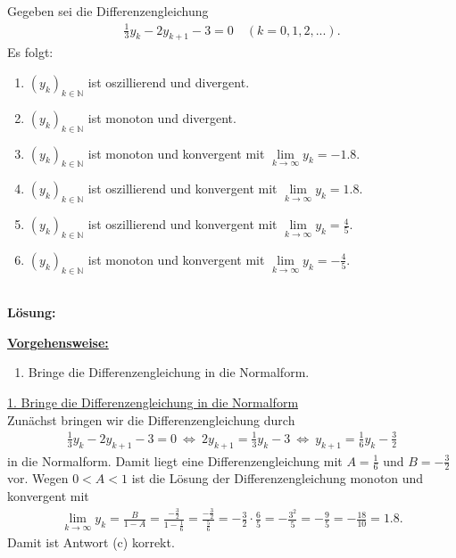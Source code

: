 \subsection*{}
Gegeben sei die Differenzengleichung
\begin{align*}
	\frac{1}{3} y_k
	-
	2 y_{k+1}
	-3
	=0
	\quad (k = 0,1,2,...).
\end{align*}
Es folgt:
\renewcommand{\labelenumi}{(\alph{enumi})}
\begin{enumerate}
	\item
	$ (y_k)_{k \in \mathbb{N}} $ ist oszillierend und divergent.
	\item
	$ (y_k)_{k \in \mathbb{N}} $ ist monoton und divergent.	
	\item 
	$ (y_k)_{k \in \mathbb{N}} $ ist monoton und konvergent mit $ \lim \limits_{k \to \infty} y_k = -1.8$.
	\item
	$ (y_k)_{k \in \mathbb{N}} $ ist oszillierend und konvergent mit $ \lim \limits_{k \to \infty} y_k = 1.8$.
	\item 
	$ (y_k)_{k \in \mathbb{N}} $ ist oszillierend und konvergent mit $ \lim \limits_{k \to \infty} y_k = \frac{4}{5}$.
	\item 
	$ (y_k)_{k \in \mathbb{N}} $ ist monoton und konvergent mit $ \lim \limits_{k \to \infty} y_k = -\frac{4}{5}$.
\end{enumerate}
\ \\
\textbf{Lösung:}
\begin{mdframed}
\underline{\textbf{Vorgehensweise:}}
\renewcommand{\labelenumi}{\theenumi.}
\begin{enumerate}
\item Bringe die Differenzengleichung in die Normalform.
\end{enumerate}
\end{mdframed}

\underline{1. Bringe die Differenzengleichung in die Normalform}\\
Zunächst bringen wir die Differenzengleichung durch
\begin{align*}
	\frac{1}{3} y_k
	-
	2 y_{k+1}
	-3
	=0
	\ \Leftrightarrow \
	2 y_{k+1} 
	= 
	\frac{1}{3} y_k
	-3
	\ \Leftrightarrow \
	 y_{k+1} 
	= 
	\frac{1}{6} y_k
	-\frac{3}{2}
\end{align*}
in die Normalform. Damit liegt eine Differenzengleichung mit $A = \frac{1}{6}$ und $B = - \frac{3}{2}$ vor.
Wegen $0 < A < 1$ ist die Lösung der Differenzengleichung monoton und konvergent mit
\begin{align*}
	\lim \limits_{k \to \infty}
	y_k
	= 
	\frac{B}{1 -A} 
	=
	\frac{- \frac{3}{2}}{1 - \frac{1}{6}}
	=
	\frac{-\frac{3}{2}}{\frac{5}{6}}
	=
	- \frac{3}{2} \cdot \frac{6}{5}
	= 
	- \frac{3^2}{5}
	= 
	- \frac{9}{5} = - \frac{18}{10} = 1.8.
\end{align*}
Damit ist Antwort (c) korrekt.